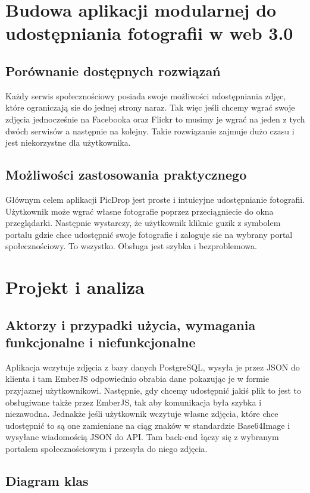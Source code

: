 \documentclass[brudnopis]{xmgr}
\begin{document}
\chapter{Budowa aplikacji modularnej do udostępniania fotografii  w web 3.0}

\section{Porównanie dostępnych rozwiązań}
Każdy serwis społecznościowy posiada swoje możliwości udostępniania zdjęc, które ograniczają sie do jednej strony naraz. Tak więc jeśli chcemy wgrać swoje zdjęcia jednocześnie na Facebooka oraz Flickr to musimy je wgrać na jeden z tych dwóch serwisów a następnie na kolejny. Takie rozwiązanie zajmuje dużo czasu i jest niekorzystne dla użytkownika.
\section{Możliwości zastosowania praktycznego}
Głównym celem aplikacji PicDrop jest proste i intuicyjne udostępnianie fotografii. Użytkownik może wgrać własne fotografie poprzez przeciągniecie do okna przeglądarki. Następnie wystarczy, że użytkownik kliknie guzik z symbolem portalu gdzie chce udostępnić swoje fotografie i zaloguje sie na wybrany portal społecznościowy. To wszystko. Obsługa jest szybka i bezproblemowa. 


\chapter{Projekt i analiza}
\section{Aktorzy i przypadki użycia, wymagania funkcjonalne i niefunkcjonalne}
Aplikacja wczytuje zdjęcia z bazy danych PostgreSQL, wysyła je przez JSON do klienta i tam EmberJS odpowiednio obrabia dane pokazując je w formie przyjaznej użytkownikowi. Następnie, gdy chcemy udostępnić jakiś plik to jest to obsługiwane także przez EmberJS, tak aby komunikacja była szybka i niezawodna. Jednakże jeśli użytkownik wczytuje własne zdjęcia, które chce udostępnić to są one zamieniane na ciąg znaków w standardzie Base64Image i wysyłane wiadomością JSON do API. Tam back-end łączy się z wybranym portalem społecznościowym i przesyła do niego zdjęcia. 
\section{Diagram klas}
\end{document}
